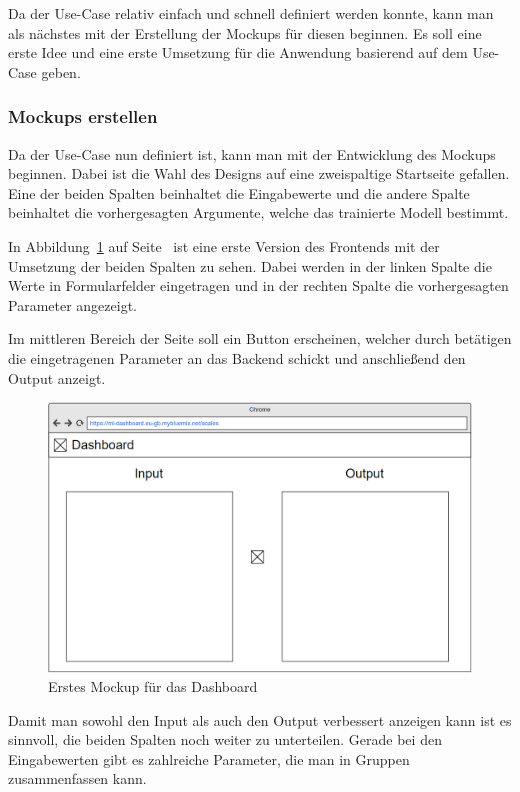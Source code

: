 Da der Use-Case relativ einfach und schnell definiert werden konnte, kann man als nächstes mit der Erstellung der
Mockups für diesen beginnen. Es soll eine erste Idee und eine erste Umsetzung für die Anwendung basierend auf dem
Use-Case geben.

\subsubsection{Mockups erstellen}
Da der Use-Case nun definiert ist, kann man mit der Entwicklung des Mockups beginnen. Dabei ist die Wahl des
Designs auf eine zweispaltige Startseite gefallen. Eine der beiden Spalten beinhaltet die Eingabewerte und die andere
Spalte beinhaltet die vorhergesagten Argumente, welche das trainierte Modell bestimmt.

In Abbildung~\ref{fig:umsetzung_mockup_scale_1} auf Seite~\pageref{fig:umsetzung_mockup_scale_1} ist eine erste Version
des Frontends mit der Umsetzung der beiden Spalten zu sehen. Dabei werden in der linken Spalte die Werte in
Formularfelder eingetragen und in der rechten Spalte die vorhergesagten Parameter angezeigt.

Im mittleren Bereich der Seite soll ein Button erscheinen, welcher durch betätigen die eingetragenen Parameter an das
Backend schickt und anschließend den Output anzeigt.

\begin{figure}[h]
    \centering
    \includegraphics[width=\textwidth]{images/kapitel_4/mockup_scale_1.png}
    \caption{Erstes Mockup für das Dashboard}
    \label{fig:umsetzung_mockup_scale_1}
\end{figure}

Damit man sowohl den Input als auch den Output verbessert anzeigen kann ist es sinnvoll, die beiden Spalten noch weiter
zu unterteilen. Gerade bei den Eingabewerten gibt es zahlreiche Parameter, die man in Gruppen zusammenfassen kann.

